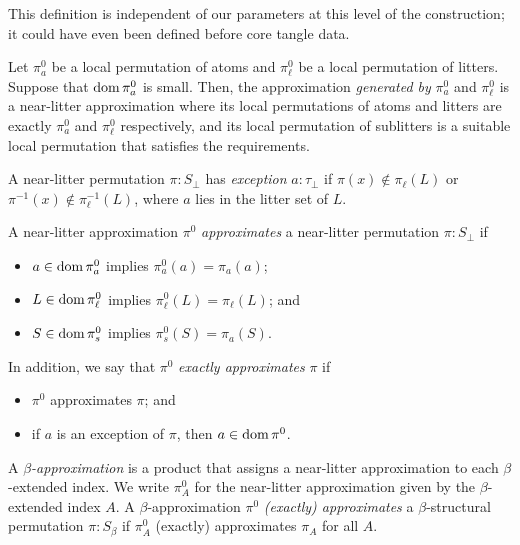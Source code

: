 \documentclass{article}
\begin{document}
\begin{remark}
    This definition is independent of our parameters at this level of the construction; it could have even been defined before core tangle data.
\end{remark}
\begin{definition}
    Let \( \pi^0_a \) be a local permutation of atoms and \( \pi^0_\ell \) be a local permutation of litters.
    Suppose that \( \operatorname{dom} \pi^0_a \) is small.
    Then, the approximation \emph{generated by} \( \pi^0_a \) and \( \pi^0_\ell \) is a near-litter approximation where its local permutations of atoms and litters are exactly \( \pi^0_a \) and \( \pi^0_\ell \) respectively, and its local permutation of sublitters is a suitable local permutation that satisfies the requirements.
\end{definition}
\begin{definition}
    A near-litter permutation \( \pi : S_\bot \) has \emph{exception} \( a : \tau_\bot \) if \( \pi(x) \not\in \pi_\ell(L) \) or \( \pi^{-1}(x) \not\in \pi^{-1}_\ell(L) \), where \( a \) lies in the litter set of \( L \).
\end{definition}
\begin{definition}
    A near-litter approximation \( \pi^0 \) \emph{approximates} a near-litter permutation \( \pi : S_\bot \) if
    \begin{itemize}
        \item \( a \in \operatorname{dom} \pi^0_a \) implies \( \pi^0_a(a) = \pi_a(a) \);
        \item \( L \in \operatorname{dom} \pi^0_\ell \) implies \( \pi^0_\ell(L) = \pi_\ell(L) \); and
        \item \( S \in \operatorname{dom} \pi^0_s \) implies \( \pi^0_s(S) = \pi_a(S) \).
    \end{itemize}
    In addition, we say that \( \pi^0 \) \emph{exactly approximates} \( \pi \) if
    \begin{itemize}
        \item \( \pi^0 \) approximates \( \pi \); and
        \item if \( a \) is an exception of \( \pi \), then \( a \in \operatorname{dom} \pi^0 \).
    \end{itemize}
\end{definition}
\begin{definition}
    A \emph{\( \beta \)-approximation} is a product that assigns a near-litter approximation to each \( \beta \)-extended index.
    We write \( \pi^0_A \) for the near-litter approximation given by the \( \beta \)-extended index \( A \).
    A \( \beta \)-approximation \( \pi^0 \) \emph{(exactly) approximates} a \( \beta \)-structural permutation \( \pi : S_\beta \) if \( \pi^0_A \) (exactly) approximates \( \pi_A \) for all \( A \).
\end{definition}
\end{document}
